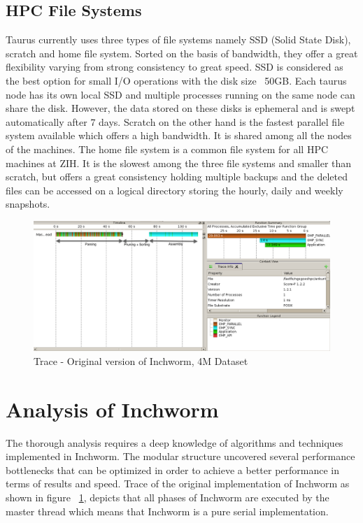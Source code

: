 \label{key}\documentclass[bachinf, english ,zihtitle,final,hyperref,utf8]{zihpub}
\begin{document}
\subsection{HPC File Systems}
Taurus currently uses three types of file systems namely SSD (Solid State Disk), scratch and home file system. Sorted on the basis of bandwidth, they offer a great flexibility varying from strong consistency to great speed. SSD is considered as the best option for small I/O operations with the disk size ~50GB. Each taurus node has its own local SSD and multiple processes running on the same node can share the disk. However, the data stored on these disks is ephemeral and is swept automatically after 7 days. Scratch on the other hand is the fastest parallel file system available which offers a high bandwidth. It is shared among all the nodes of the machines. The home file system is a common file system for all HPC machines at ZIH. It is the slowest among the three file systems and smaller than scratch, but offers a great consistency holding multiple backups and the deleted files can be accessed on a logical directory storing the hourly, daily and weekly snapshots.
\begin{figure}[h]
\center
\includegraphics[scale=0.35]{trace-original}
\caption{Trace - Original version of Inchworm, 4M Dataset}
\label{trace-original}
\end{figure}
\section{Analysis of Inchworm}
The thorough analysis requires a deep knowledge of algorithms and techniques implemented in Inchworm. The modular structure uncovered several performance bottlenecks that can be optimized in order to achieve a better performance in terms of results and speed. Trace of the original implementation of Inchworm as shown in figure ~\ref{trace-original}, depicts that all phases of Inchworm are executed by the master thread which means that Inchworm is a pure serial implementation.
\end{document}
